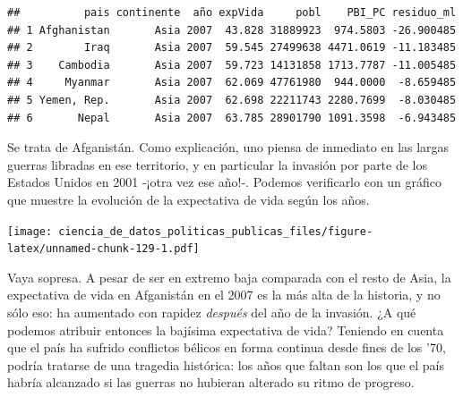 \documentclass[]{book}
\newenvironment{Shaded}{\begin{snugshade}}{\end{snugshade}}
\newcommand{\KeywordTok}[1]{\textcolor[rgb]{0.13,0.29,0.53}{\textbf{#1}}}
\newcommand{\DataTypeTok}[1]{\textcolor[rgb]{0.13,0.29,0.53}{#1}}
\newcommand{\StringTok}[1]{\textcolor[rgb]{0.31,0.60,0.02}{#1}}
\newcommand{\OperatorTok}[1]{\textcolor[rgb]{0.81,0.36,0.00}{\textbf{#1}}}
\newcommand{\NormalTok}[1]{#1}
\begin{document}
\begin{verbatim}
##          pais continente  año expVida     pobl    PBI_PC residuo_ml
## 1 Afghanistan       Asia 2007  43.828 31889923  974.5803 -26.900485
## 2        Iraq       Asia 2007  59.545 27499638 4471.0619 -11.183485
## 3    Cambodia       Asia 2007  59.723 14131858 1713.7787 -11.005485
## 4     Myanmar       Asia 2007  62.069 47761980  944.0000  -8.659485
## 5 Yemen, Rep.       Asia 2007  62.698 22211743 2280.7699  -8.030485
## 6       Nepal       Asia 2007  63.785 28901790 1091.3598  -6.943485
\end{verbatim}

Se trata de Afganistán. Como explicación, uno piensa de inmediato en las
largas guerras libradas en ese territorio, y en particular la invasión
por parte de los Estados Unidos en 2001 -¡otra vez ese año!-. Podemos
verificarlo con un gráfico que muestre la evolución de la expectativa de
vida según los años.

\begin{Shaded}
\end{Shaded}

\texttt{[image: ciencia\_de\_datos\_politicas\_publicas\_files/figure-latex/unnamed-chunk-129-1.pdf]}

Vaya sopresa. A pesar de ser en extremo baja comparada con el resto de
Asia, la expectativa de vida en Afganistán en el 2007 es la más alta de
la historia, y no sólo eso: ha aumentado con rapidez \emph{después} del
año de la invasión. ¿A qué podemos atribuir entonces la bajísima
expectativa de vida? Teniendo en cuenta que el país ha sufrido
conflictos bélicos en forma continua desde fines de los '70, podría
tratarse de una tragedia histórica: los años que faltan son los que el
país habría alcanzado si las guerras no hubieran alterado su ritmo de
progreso.
\end{document}

